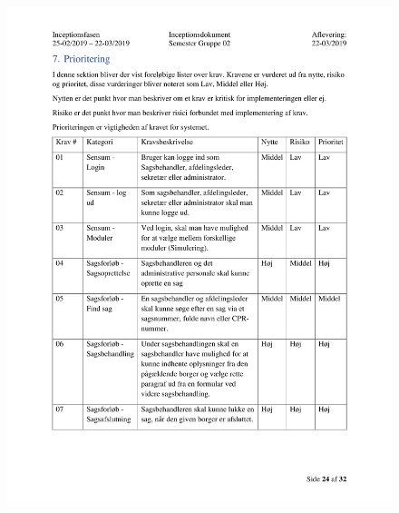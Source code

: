 \begin{figure}[hb]
  \includegraphics[scale = 0.33]{./PNG/Inceptions/Gruppe 02 + InceptionsDokument-25.jpg} 
\end{figure}

